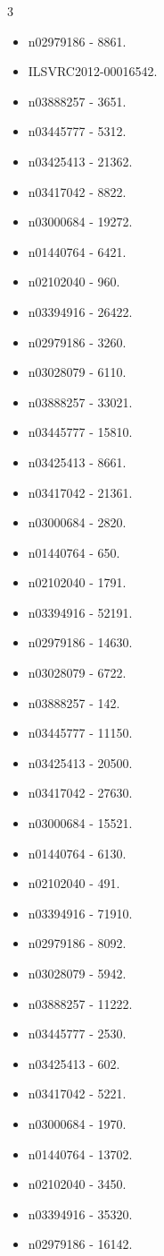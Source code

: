 \begin{multicols}{3}
\begin{itemize}
\item n02979186 - 8861.
\item ILSVRC2012-00016542.
\item n03888257 - 3651.
\item n03445777 - 5312.
\item n03425413 - 21362.
\item n03417042 - 8822.
\item n03000684 - 19272.
\item n01440764 - 6421.
\item n02102040 - 960.
\item n03394916 - 26422.
\item n02979186 - 3260.
\item n03028079 - 6110.
\item n03888257 - 33021.
\item n03445777 - 15810.
\item n03425413 - 8661.
\item n03417042 - 21361.
\item n03000684 - 2820.
\item n01440764 - 650.
\item n02102040 - 1791.
\item n03394916 - 52191.
\item n02979186 - 14630.
\item n03028079 - 6722.
\item n03888257 - 142.
\item n03445777 - 11150.
\item n03425413 - 20500.
\item n03417042 - 27630.
\item n03000684 - 15521.
\item n01440764 - 6130.
\item n02102040 - 491.
\item n03394916 - 71910.
\item n02979186 - 8092.
\item n03028079 - 5942.
\item n03888257 - 11222.
\item n03445777 - 2530.
\item n03425413 - 602.
\item n03417042 - 5221.
\item n03000684 - 1970.
\item n01440764 - 13702.
\item n02102040 - 3450.
\item n03394916 - 35320.
\item n02979186 - 16142.

\end{itemize}
\end{multicols}
